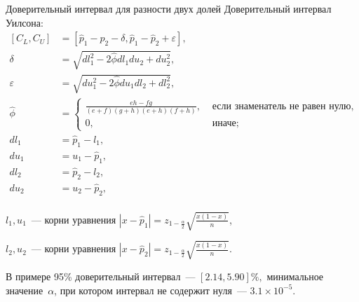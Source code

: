 \documentclass[9pt,pdf,utf8,hyperref={unicode},aspectratio=169]{beamer}
\begin{document}
\begin{frame}{Доверительный интервал для разности двух долей}
    Доверительный интервал Уилсона:
    \begin{align*}
        \left[C_L, C_U\right] &= \left[\hat{p}_1-\hat{p}_2 - \delta, \hat{p}_1-\hat{p}_2 + \varepsilon\right], \\
        \delta                &= \sqrt{dl_1^2 - 2\hat{\phi}dl_1 du_2 + du_2^2}, \\
        \varepsilon           &= \sqrt{du_1^2 - 2\hat{\phi}du_1 dl_2 + dl_2^2}, \\
        \hat{\phi}             &= \begin{cases}
                                    \frac{eh-fg}{\left(e+f\right)\left(g+h\right)\left(e+h\right)\left(f+h\right)}, & \text{ если знаменатель не равен нулю}, \\
                                    0, & \text{ иначе};
                                 \end{cases}   \\
        dl_1                  &= \hat{p}_1 - l_1, \\
        du_1                  &= u_1 - \hat{p}_1, \\
        dl_2                  &= \hat{p}_2 - l_2, \\
        du_2                  &= u_2 - \hat{p}_2, \\
    \end{align*}

    \vspace{-15pt}

    $l_1, u_1$~--- корни уравнения $\left|x-\hat{p}_1\right| = z_{1-\frac{\alpha}{2}} \sqrt{\frac{x\left(1-x\right)}{n}}$,

    $l_2, u_2$~--- корни уравнения $\left|x-\hat{p}_2\right| = z_{1-\frac{\alpha}{2}} \sqrt{\frac{x\left(1-x\right)}{n}}$.

	\bigskip
	
    В примере 95\% доверительный интервал~--- $[2.14, 5.90]\%,$ минимальное значение~$\alpha$, при котором интервал не содержит нуля~--- $3.1 \times 10^{-5}$.

\end{frame}
\end{document}
